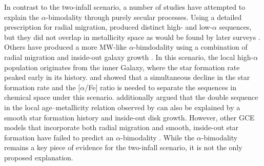 \documentclass[twocolumn,twocolappendix,linenumbers]{aastex631}
\newcommand{\todo}[1]{{\color{red}#1}}
\newcommand{\aFe}{[$\alpha$/Fe]\xspace}
\begin{document}
In contrast to the two-infall scenario, a number of studies have attempted to explain the $\alpha$-bimodality through purely secular processes. 
Using a detailed prescription for radial migration, \citet{schonrich_chemical_2009} produced distinct high- and low-$\alpha$ sequences, but they did not overlap in metallicity space as would be found by later surveys \citep[e.g.,][]{bensby_exploring_2014}. Others have produced a more MW-like $\alpha$-bimdodality using a combination of radial migration and inside-out galaxy growth \citep[e.g.,][]{kubryk_evolution_2015,sharma_chemical_2021,chen_chemical_2023,prantzos_origin_2023}. In this scenario, the local high-$\alpha$ population originates from the inner Galaxy, where the star formation rate peaked early in its history. \citet{sharma_chemical_2021} and \citet{chen_chemical_2023} showed that a simultaneous decline in the star formation rate and the \aFe ratio is needed to separate the sequences in chemical space under this scenario. \citet{chen_recent_2025} additionally argued that the double sequence in the local age--metallicity relation observed by \citet{nissen_high-precision_2020} can also be explained by a smooth star formation history and inside-out disk growth. However, other GCE models that incorporate both radial migration and smooth, inside-out star formation have failed to predict an $\alpha$-bimodality \citep[e.g.,][]{johnson_stellar_2021,dubay_galactic_2024}. While the $\alpha$-bimodality remains a key piece of evidence for the two-infall scenario, it is not the only proposed explanation.
\end{document}
